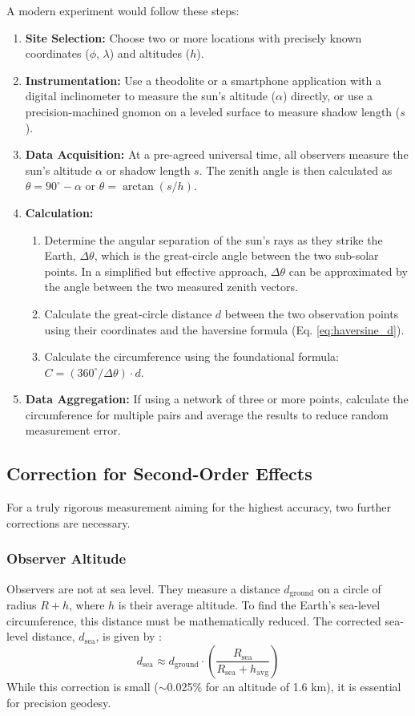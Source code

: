 \documentclass[11pt]{article}
\DeclareMathOperator{\atan}{arctan}
\begin{document}
A modern experiment would follow these steps:
\begin{enumerate}
    \item \textbf{Site Selection:} Choose two or more locations with precisely known coordinates ($\phi$, $\lambda$) and altitudes ($h$).
    \item \textbf{Instrumentation:} Use a theodolite or a smartphone application with a digital inclinometer to measure the sun's altitude ($\alpha$) directly, or use a precision-machined gnomon on a leveled surface to measure shadow length ($s$).
    \item \textbf{Data Acquisition:} At a pre-agreed universal time, all observers measure the sun's altitude $\alpha$ or shadow length $s$. The zenith angle is then calculated as $\theta = 90^{\circ} - \alpha$ or $\theta = \atan(s/h)$.
    \item \textbf{Calculation:}
    \begin{enumerate}
        \item Determine the angular separation of the sun's rays as they strike the Earth, $\Delta\theta$, which is the great-circle angle between the two sub-solar points. In a simplified but effective approach, $\Delta\theta$ can be approximated by the angle between the two measured zenith vectors.
        \item Calculate the great-circle distance $d$ between the two observation points using their coordinates and the haversine formula (Eq. \ref{eq:haversine_d}).
        \item Calculate the circumference using the foundational formula: $C = (360^{\circ}/\Delta\theta) \cdot d$.
    \end{enumerate}
    \item \textbf{Data Aggregation:} If using a network of three or more points, calculate the circumference for multiple pairs and average the results to reduce random measurement error.
\end{enumerate}

\subsection{Correction for Second-Order Effects}
For a truly rigorous measurement aiming for the highest accuracy, two further corrections are necessary.

\subsubsection{Observer Altitude}
Observers are not at sea level. They measure a distance $d_{\text{ground}}$ on a circle of radius $R + h$, where $h$ is their average altitude. To find the Earth's sea-level circumference, this distance must be mathematically reduced. The corrected sea-level distance, $d_{\text{sea}}$, is given by \cite{Vanicek1986}:
\begin{equation}
    d_{\text{sea}} \approx d_{\text{ground}} \cdot \left(\frac{R_{\text{sea}}}{R_{\text{sea}} + h_{\text{avg}}}\right)
    \label{eq:altitude_correction}
\end{equation}
While this correction is small ($\sim$0.025\% for an altitude of 1.6 km), it is essential for precision geodesy.
\end{document}
